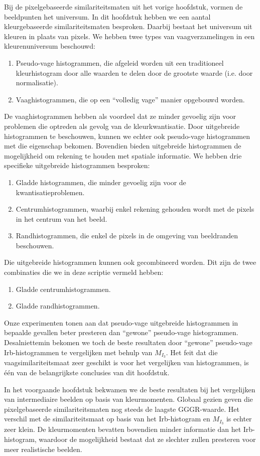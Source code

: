 Bij de pixelgebaseerde similariteitsmaten uit het vorige hoofdstuk, vormen de beeldpunten
het universum. In dit hoofdstuk hebben we een aantal kleurgebaseerde similariteitsmaten 
besproken. Daarbij bestaat het universum uit kleuren in plaats van pixels. 
We hebben twee types van vaagverzamelingen in een kleurenuniversum beschouwd:
\begin{enumerate}
  \item Pseudo-vage histogrammen, die afgeleid worden uit een traditioneel
  kleurhistogram door alle waarden te delen door de grootste waarde (i.e. door normalisatie).
  \item Vaaghistogrammen, die op een ``volledig vage'' manier opgebouwd worden.
\end{enumerate}
De vaaghistogrammen hebben als voordeel dat ze minder gevoelig zijn voor problemen
die optreden als gevolg van de kleurkwantisatie. Door uitgebreide histogrammen
te beschouwen, kunnen we echter ook pseudo-vage histogrammen met die eigenschap
bekomen. Bovendien bieden uitgebreide histogrammen de mogelijkheid om rekening te houden
met spatiale informatie. We hebben drie specifieke uitgebreide histogrammen
besproken: 
\begin{enumerate}
  \item Gladde histogrammen, die minder gevoelig zijn voor de kwantisatieproblemen.
  \item Centrumhistogrammen, waarbij enkel rekening gehouden wordt met de pixels
  in het centrum van het beeld.
  \item Randhistogrammen, die enkel de pixels in de omgeving van beeldranden beschouwen.
\end{enumerate}
Die uitgebreide histogrammen kunnen ook gecombineerd worden. Dit zijn de twee combinaties
die we in deze scriptie vermeld hebben:
\begin{enumerate}
  \item Gladde centrumhistogrammen.
  \item Gladde randhistogrammen.
\end{enumerate}

Onze experimenten tonen aan dat pseudo-vage uitgebreide histogrammen in bepaalde gevallen 
beter presteren dan ``gewone'' pseudo-vage histogrammen. Desalniettemin bekomen
we toch de beste resultaten door ``gewone'' pseudo-vage Irb-histogrammen te 
vergelijken met behulp van $M_{I_3}$. Het feit dat die vaagsimilariteitsmaat
zeer geschikt is voor het vergelijken van histogrammen, is \'e\'en van de
belangrijkste conclusies van dit hoofdstuk.

In het voorgaande hoofdstuk bekwamen we de beste resultaten bij het
vergelijken van intermediaire beelden op basis van kleurmomenten. 
Globaal gezien geven die pixelgebaseerde similariteitsmaten nog steeds de laagste
GGGR-waarde. Het verschil met de similariteitsmaat op basis van het Irb-histogram en
$M_{I_3}$ is echter zeer klein. De kleurmomenten bevatten bovendien minder informatie dan
het Irb-histogram, waardoor de mogelijkheid bestaat dat ze slechter zullen presteren 
voor meer realistische beelden.